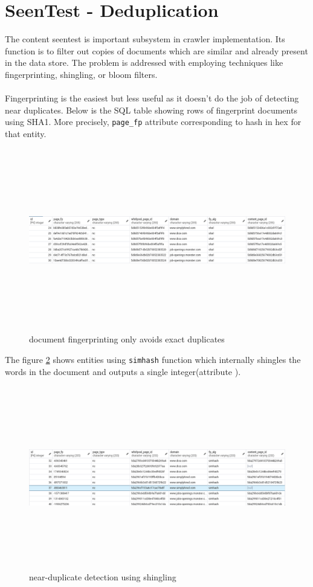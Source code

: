 \section{SeenTest - Deduplication}
The content seentest is important subsystem in crawler implementation. Its function is to filter out
copies of documents which are similar and already present in the data store. The problem is addressed
with employing techniques like fingerprinting, shingling, or bloom filters.
\\
\\
Fingerprinting is the easiest but less useful as it doesn't do the job of detecting near duplicates.
Below is the SQL table showing rows of fingerprint documents using SHA1. More precisely, \texttt{page\_fp}
attribute corresponding to hash in hex for that entity.

\begin{figure}[h!]
  \centering
  \includegraphics[width=18cm,height=8cm,keepaspectratio]{../media/crawler/fingerprinting.png}
  \caption{document fingerprinting only avoids exact duplicates}
  \label{fig:fingerprinting}
\end{figure}

\noindent
The figure \ref{fig:simhashing} shows entities using \texttt{simhash}\cite{dedupe} function which
internally shingles the words in the document and outputs a single integer(attribute ).
\begin{figure}[h!]
  \centering
  \includegraphics[width=18cm,height=8cm,keepaspectratio]{../media/crawler/shingles.png}
  \caption{near-duplicate detection using shingling\cite{dedupe}}
  \label{fig:simhashing}
\end{figure}

